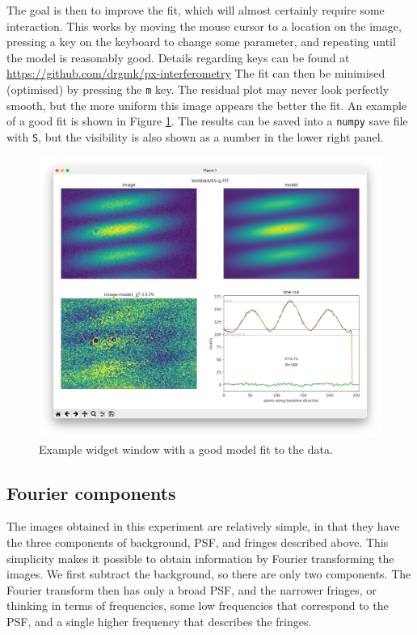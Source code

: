 \documentclass[11pt]{article}
\begin{document}
The goal is then to improve the fit, which will almost certainly require some interaction. This works by moving the mouse cursor to a location on the image, pressing a key on the keyboard to change some parameter, and repeating until the model is reasonably good. Details regarding keys can be found at \href{https://github.com/drgmk/px-interferometry}{https://github.com/drgmk/px-interferometry} The fit can then be minimised (optimised) by pressing the \texttt{m} key. The residual plot may never look perfectly smooth, but the more uniform this image appears the better the fit. An example of a good fit is shown in Figure \ref{fig:widget2}. The results can be saved into a \texttt{numpy} save file with \texttt{S}, but the visibility is also shown as a number in the lower right panel.

\begin{figure}[h]
    \centering
    \includegraphics[width=1\textwidth]{widget2.png}
    \caption{Example widget window with a good model fit to the data.}
    \label{fig:widget2}
\end{figure}

\subsection{Fourier components}

The images obtained in this experiment are relatively simple, in that they have the three components of background, PSF, and fringes described above. This simplicity makes it possible to obtain information by Fourier transforming the images. We first subtract the background, so there are only two components. The Fourier transform then has only a broad PSF, and the narrower fringes, or thinking in terms of frequencies, some low frequencies that correspond to the PSF, and a single higher frequency that describes the fringes.
\end{document}
